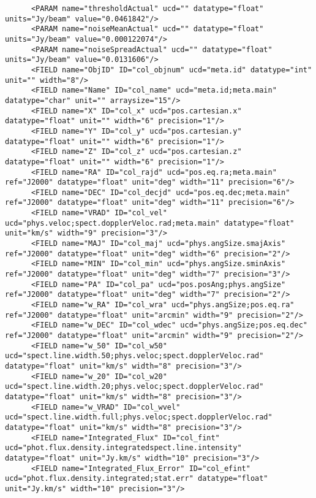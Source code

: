 {\begin{verbatim}
      <PARAM name="thresholdActual" ucd="" datatype="float" units="Jy/beam" value="0.0461842"/>
      <PARAM name="noiseMeanActual" ucd="" datatype="float" units="Jy/beam" value="0.000122074"/>
      <PARAM name="noiseSpreadActual" ucd="" datatype="float" units="Jy/beam" value="0.0131606"/>
      <FIELD name="ObjID" ID="col_objnum" ucd="meta.id" datatype="int" unit="" width="8"/>
      <FIELD name="Name" ID="col_name" ucd="meta.id;meta.main" datatype="char" unit="" arraysize="15"/>
      <FIELD name="X" ID="col_x" ucd="pos.cartesian.x" datatype="float" unit="" width="6" precision="1"/>
      <FIELD name="Y" ID="col_y" ucd="pos.cartesian.y" datatype="float" unit="" width="6" precision="1"/>
      <FIELD name="Z" ID="col_z" ucd="pos.cartesian.z" datatype="float" unit="" width="6" precision="1"/>
      <FIELD name="RA" ID="col_rajd" ucd="pos.eq.ra;meta.main" ref="J2000" datatype="float" unit="deg" width="11" precision="6"/>
      <FIELD name="DEC" ID="col_decjd" ucd="pos.eq.dec;meta.main" ref="J2000" datatype="float" unit="deg" width="11" precision="6"/>
      <FIELD name="VRAD" ID="col_vel" ucd="phys.veloc;spect.dopplerVeloc.rad;meta.main" datatype="float" unit="km/s" width="9" precision="3"/>
      <FIELD name="MAJ" ID="col_maj" ucd="phys.angSize.smajAxis" ref="J2000" datatype="float" unit="deg" width="6" precision="2"/>
      <FIELD name="MIN" ID="col_min" ucd="phys.angSize.sminAxis" ref="J2000" datatype="float" unit="deg" width="7" precision="3"/>
      <FIELD name="PA" ID="col_pa" ucd="pos.posAng;phys.angSize" ref="J2000" datatype="float" unit="deg" width="7" precision="2"/>
      <FIELD name="w_RA" ID="col_wra" ucd="phys.angSize;pos.eq.ra" ref="J2000" datatype="float" unit="arcmin" width="9" precision="2"/>
      <FIELD name="w_DEC" ID="col_wdec" ucd="phys.angSize;pos.eq.dec" ref="J2000" datatype="float" unit="arcmin" width="9" precision="2"/>
      <FIELD name="w_50" ID="col_w50" ucd="spect.line.width.50;phys.veloc;spect.dopplerVeloc.rad" datatype="float" unit="km/s" width="8" precision="3"/>
      <FIELD name="w_20" ID="col_w20" ucd="spect.line.width.20;phys.veloc;spect.dopplerVeloc.rad" datatype="float" unit="km/s" width="8" precision="3"/>
      <FIELD name="w_VRAD" ID="col_wvel" ucd="spect.line.width.full;phys.veloc;spect.dopplerVeloc.rad" datatype="float" unit="km/s" width="8" precision="3"/>
      <FIELD name="Integrated_Flux" ID="col_fint" ucd="phot.flux.density.integratedspect.line.intensity" datatype="float" unit="Jy.km/s" width="10" precision="3"/>
      <FIELD name="Integrated_Flux_Error" ID="col_efint" ucd="phot.flux.density.integrated;stat.err" datatype="float" unit="Jy.km/s" width="10" precision="3"/>

\end{verbatim}}
